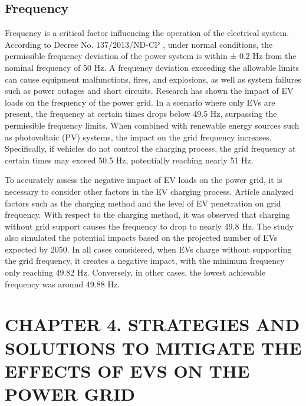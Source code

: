 \documentclass{thesis}
\begin{document}
\subsection{Frequency}
Frequency is a critical factor influencing the operation of the electrical system. According to Decree No. 137/2013/ND-CP \cite{82_greenin}, under normal conditions, the permissible frequency deviation of the power system is within ± 0.2 Hz from the nominal frequency of 50 Hz. A frequency deviation exceeding the allowable limits can cause equipment malfunctions, fires, and explosions, as well as system failures such as power outages and short circuits. Research \cite{83_greenin} has shown the impact of EV loads on the frequency of the power grid. In a scenario where only EVs are present, the frequency at certain times drops below 49.5 Hz, surpassing the permissible frequency limits. When combined with renewable energy sources such as photovoltaic (PV) systems, the impact on the grid frequency increases. Specifically, if vehicles do not control the charging process, the grid frequency at certain times may exceed 50.5 Hz, potentially reaching nearly 51 Hz.

To accurately assess the negative impact of EV loads on the power grid, it is necessary to consider other factors in the EV charging process. Article \cite{84_greenin} analyzed factors such as the charging method and the level of EV penetration on grid frequency. With respect to the charging method, it was observed that charging without grid support causes the frequency to drop to nearly 49.8 Hz. The study also simulated the potential impacts based on the projected number of EVs expected by 2050. In all cases considered, when EVs charge without supporting the grid frequency, it creates a negative impact, with the minimum frequency only reaching 49.82 Hz. Conversely, in other cases, the lowest achievable frequency was around 49.88 Hz.



\newpage
\section*{CHAPTER 4. STRATEGIES AND SOLUTIONS TO MITIGATE THE EFFECTS OF EVS ON THE POWER GRID}
\end{document}
